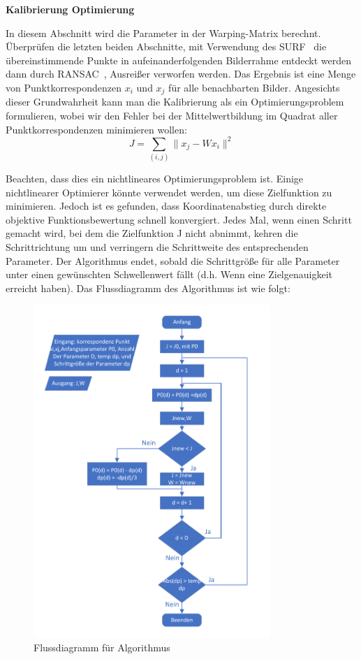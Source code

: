 \textbf{Kalibrierung Optimierung}

In diesem Abschnitt wird die Parameter in der Warping-Matrix berechnt. Überprüfen die letzten beiden Abschnitte, mit Verwendung des SURF~\cite{Surf} die übereinstimmende Punkte in aufeinanderfolgenden Bilderrahme entdeckt werden dann durch RANSAC~\cite{ransac1}, Ausreißer verworfen werden. Das Ergebnis ist eine Menge von Punktkorrespondenzen $x_i$ und $x_j$ für alle benachbarten Bilder. Angesichts dieser Grundwahrheit kann man die Kalibrierung als ein Optimierungsproblem formulieren, wobei wir den Fehler bei der Mittelwertbildung im Quadrat aller Punktkorrespondenzen minimieren wollen:
\begin{equation}
   J = \sum_{(i,j)}\lVert x_j - Wx_i \rVert ^2
\end{equation}

Beachten, dass dies ein nichtlineares Optimierungsproblem ist. Einige nichtlinearer Optimierer könnte verwendet werden, um diese Zielfunktion zu minimieren. Jedoch ist es gefunden, dass Koordinatenabstieg durch direkte objektive Funktionsbewertung schnell konvergiert. Jedes Mal, wenn einen Schritt gemacht wird, bei dem die Zielfunktion J nicht abnimmt, kehren die Schrittrichtung um und verringern die Schrittweite des entsprechenden
Parameter. Der Algorithmus endet, sobald die Schrittgröße für alle Parameter unter einen gewünschten Schwellenwert fällt (d.h. Wenn eine Zielgenauigkeit erreicht haben). Das Flussdiagramm des Algorithmus ist wie folgt:

\begin{figure}[H]
 \centering 
 \includegraphics[keepaspectratio,width=0.8\textwidth]{images/4_ZweiteErfahrung/Kamera/flussdiagramm_for_parameter.pdf}
 \caption{Flussdiagramm für Algorithmus}
 \label{fig:rotationsmodel}
\end{figure} 

